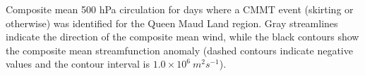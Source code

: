 \label{fig:queen_maud}
Composite mean 500 hPa circulation for days where a CMMT event (skirting or otherwise) was identified for the Queen Maud Land region. Gray streamlines indicate the direction of the composite mean wind, while the black contours show the composite mean streamfunction anomaly (dashed contours indicate negative values and the contour interval is $1.0 \times 10^6 \: m^2 s^{-1}$). 